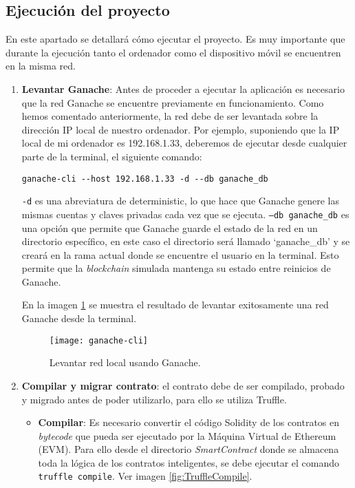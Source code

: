 \subsection{Ejecución del proyecto}

En este apartado se detallará cómo ejecutar el proyecto. Es muy importante que durante la ejecución tanto el ordenador como el dispositivo móvil se encuentren en la misma red.

\begin{enumerate}

\item \textbf{Levantar Ganache}: Antes de proceder a ejecutar la aplicación es necesario que la red Ganache se encuentre previamente en funcionamiento.
Como hemos comentado anteriormente, la red debe de ser levantada sobre la dirección IP local de nuestro ordenador. Por ejemplo, suponiendo que la IP local de mi ordenador es 192.168.1.33, deberemos de ejecutar desde cualquier parte de la terminal, el siguiente comando: 
\begin{verbatim}
ganache-cli --host 192.168.1.33 -d --db ganache_db
\end{verbatim}

\texttt{-d} es una abreviatura de deterministic, lo que hace que Ganache genere las mismas cuentas y claves privadas cada vez que se ejecuta.
\texttt{--db ganache\_db} es una opción que permite que Ganache guarde el estado de la red en un directorio específico, en este caso el directorio será llamado `ganache\_db' y se creará en la rama actual donde se encuentre el usuario en la terminal.
Esto permite que la \textit{blockchain} simulada mantenga su estado entre reinicios de Ganache.

En la imagen \ref{fig:ganache-cli} se muestra el resultado de levantar exitosamente una red Ganache desde la terminal.

\begin{figure}[h]
	\centering
	\texttt{[image: ganache-cli]}
	\caption[Levantar red Ganache]{Levantar red local usando Ganache.}
	\label{fig:ganache-cli}
\end{figure}

\item \textbf{Compilar y migrar contrato}: el contrato debe de ser compilado, probado y migrado antes de poder utilizarlo, para ello se utiliza Truffle.

	\begin{itemize}
	\item \textbf{Compilar}: Es necesario convertir el código
	Solidity de los contratos en \textit{bytecode} que pueda
	ser ejecutado por la Máquina Virtual de Ethereum (EVM).
	Para ello desde el directorio \textit{SmartContract} donde se
	almacena toda la lógica de los contratos
	inteligentes, se debe ejecutar el comando \texttt{truffle
	compile}.
	Ver imagen \ref{fig:TruffleCompile}.
	\end{itemize}
	

\end{enumerate}
